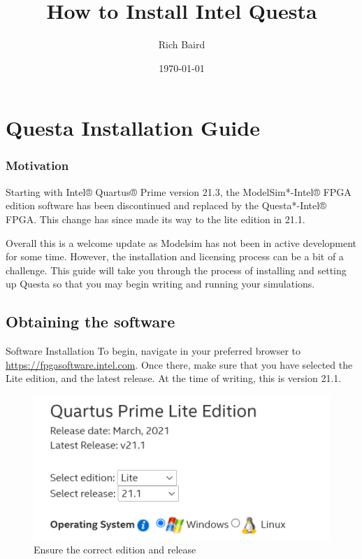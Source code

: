 \documentclass[fleqn]{beamer}
\title{How to Install Intel Questa}
\author{Rich Baird}
\institute[University of Utah]{}
\date{\today}
\begin{document}
\begin{frame}
  \titlepage
\end{frame}

\section{Questa Installation Guide}
\begin{frame}
  \frametitle{Motivation}
    Starting with Intel® Quartus® Prime version 21.3, the ModelSim*-Intel® FPGA edition software has been discontinued and replaced by the Questa*-Intel® FPGA. This change has since made its way to the lite edition in 21.1. \par
    Overall this is a welcome update as Modelsim has not been in active development for some time. However, the installation and licensing process can be a bit of a challenge. This guide will take you through the process of installing and setting up Questa so that you may begin writing and running your simulations.
\end{frame}

\subsection{Obtaining the software}
\begin{frame}{Software Installation}
    To begin, navigate in your preferred browser to \url{https://fpgasoftware.intel.com}. Once there, make sure that you have selected the Lite edition, and the latest release. At the time of writing, this is version 21.1.
    
\begin{figure}
    \centering
    \includegraphics[scale=.5]{figures/QLite21.png}
    \caption{Ensure the correct edition and release}
    \label{fig:editionrelease}
\end{figure}
\end{frame}
\end{document}
